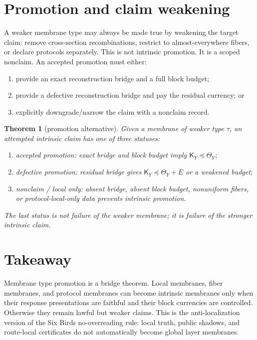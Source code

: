 \documentclass[11pt]{article}
\newtheorem{theorem}{Theorem}[section]
\newcommand{\K}{\mathsf K}
\newcommand{\Th}{\Theta}
\newcommand{\Loewner}{\preceq}
\begin{document}
\section{Promotion and claim weakening}

A weaker membrane type may always be made true by weakening the target claim: remove cross-section recombinations, restrict to almost-everywhere fibers, or declare protocols separately.  This is not intrinsic promotion.  It is a scoped nonclaim.  An accepted promotion must either:
\begin{enumerate}[label=(\alph*)]
\item provide an exact reconstruction bridge and a full block budget;
\item provide a defective reconstruction bridge and pay the residual currency; or
\item explicitly downgrade/narrow the claim with a nonclaim record.
\end{enumerate}

\begin{theorem}[promotion alternative]
Given a membrane of weaker type \(\tau\), an attempted intrinsic claim has one of three statuses:
\begin{enumerate}[label=(\roman*)]
\item \emph{accepted promotion}: exact bridge and block budget imply \(\K_Y\Loewner\Th_Y\);
\item \emph{defective promotion}: residual bridge gives \(\K_Y\Loewner\Th_Y+E\) or a weakened budget;
\item \emph{nonclaim / local only}: absent bridge, absent block budget, nonuniform fibers, or protocol-local-only data prevents intrinsic promotion.
\end{enumerate}
The last status is not failure of the weaker membrane; it is failure of the stronger intrinsic claim.
\end{theorem}

\section{Takeaway}

Membrane type promotion is a bridge theorem.  Local membranes, fiber membranes, and protocol membranes can become intrinsic membranes only when their response presentations are faithful and their block currencies are controlled.  Otherwise they remain lawful but weaker claims.  This is the anti-localization version of the Six Birds no-overreading rule: local truth, public shadows, and route-local certificates do not automatically become global layer membranes.
\end{document}
